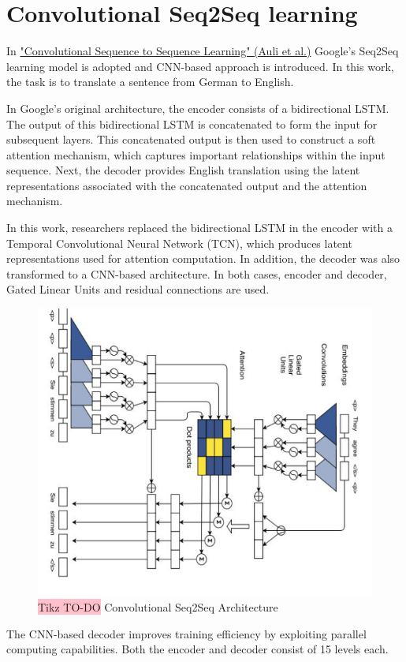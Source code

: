 \section{Convolutional Seq2Seq learning}
In \href{https://arxiv.org/pdf/1705.03122}{"Convolutional Sequence to Sequence Learning" (Auli et al.)} Google's Seq2Seq learning model is adopted and CNN-based approach is introduced. In this work, the task is to translate a sentence from German to English.

In Google's original architecture, the encoder consists of a bidirectional LSTM. The output of this bidirectional LSTM is concatenated to form the input for subsequent layers. This concatenated output is then used to construct a soft attention mechanism, which captures important relationships within the input sequence. Next, the decoder provides English translation using the latent representations associated with the concatenated output and the attention mechanism.

In this work, researchers replaced the bidirectional LSTM in the encoder with a Temporal Convolutional Neural Network (TCN), which produces latent representations used for attention computation. In addition, the decoder was also transformed to a CNN-based architecture. In both cases, encoder and decoder, Gated Linear Units and residual connections are used.

\begin{figure}[!htbp]
    \centering
    \includegraphics[width=0.6\linewidth]{tikz/chapter8 - Convolutional Seq2Seq.png}
    \caption{{\color{red}\colorbox{pink}{Tikz TO-DO}} Convolutional Seq2Seq Architecture}
\end{figure}

The CNN-based decoder improves training efficiency by exploiting parallel computing capabilities. Both the encoder and decoder consist of 15 levels each.

